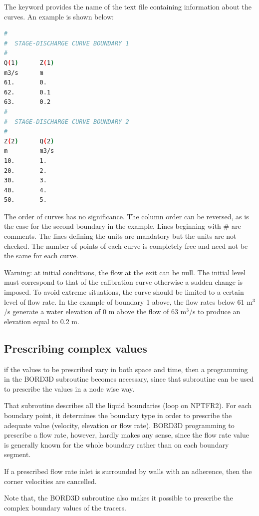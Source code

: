 The keyword  provides the name of the text
file containing information about the curves. An example is shown below:

\begin{lstlisting}[language=bash]
#
#  STAGE-DISCHARGE CURVE BOUNDARY 1
#
Q(1)      Z(1)
m3/s      m
61.       0.
62.       0.1
63.       0.2
#
#  STAGE-DISCHARGE CURVE BOUNDARY 2
#
Z(2)      Q(2)
m         m3/s
10.       1.
20.       2.
30.       3.
40.       4.
50.       5.
\end{lstlisting}

The order of curves has no significance. The column order can be reversed, as
is the case for the second boundary in the example. Lines beginning with \# are
comments. The lines defining the units are mandatory but the units are not
checked. The number of points of each curve is completely free and need not be
the same for each curve.

Warning: at initial conditions, the flow at the exit can be null. The initial
level must correspond to that of the calibration curve otherwise a sudden
change is imposed. To avoid extreme situations, the curve should be limited to
a certain level of flow rate. In the example of boundary 1 above, the flow
rates below 61 m${}^{3}$/s generate a water elevation of 0 m above the flow of
63 m${}^{3}$/s to produce an elevation equal to 0.2 m.

\subsection{Prescribing complex values}

if the values to be prescribed vary in both space and time, then a programming
in the BORD3D subroutine becomes necessary, since that subroutine can be
used to prescribe the values in a node wise way.

That subroutine describes all the liquid boundaries (loop on NPTFR2).
For each boundary point, it determines the boundary type in order to prescribe
the adequate value (velocity, elevation or flow rate). BORD3D programming to
prescribe a flow rate, however, hardly makes any sense, since the flow rate
value is generally known for the whole boundary rather than on each boundary
segment.

If a prescribed flow rate inlet is surrounded by walls with an adherence, then
the corner velocities are cancelled.

Note that, the BORD3D subroutine also makes it possible to prescribe the
complex boundary values of the tracers.

